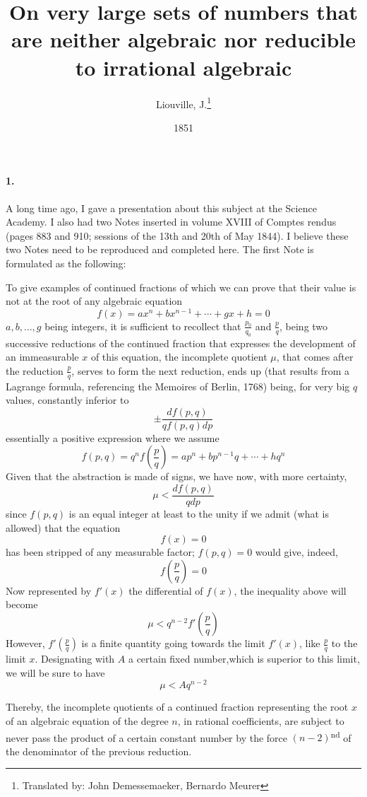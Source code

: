 \documentclass{article}
\title{On very large sets of numbers that are neither algebraic nor reducible to irrational algebraic}
\date{1851}
\author{Liouville, J.\thanks{%
    Translated by: John Demessemaeker, Bernardo Meurer}}
\begin{document}
\maketitle
\newpage

\paragraph{1.}
A long time ago, I gave a presentation about this subject at the Science
Academy. I also had two Notes inserted in volume XVIII of Comptes rendus
(pages 883 and 910; sessions of the 13th and 20th of May 1844). I believe these
two Notes need to be reproduced and completed here. The first Note is formulated
as the following:
\begin{displayquote}
	To give examples of continued fractions of which we can prove that their
	value is not at the root of any algebraic equation
	$$f(x)=ax^n + bx^{n-1} + \cdots + gx + h = 0$$
	$a, b, \ldots, g$ being integers, it is sufficient to recollect that
	$\frac{p_0}{q_0}$ and $\frac{p}{q}$, being two successive reductions of the
	continued fraction that expresses the development of an immeasurable $x$ of
	this equation, the incomplete quotient $\mu$, that comes after the reduction
	$\frac{p}{q}$, serves to form the next reduction, ends up (that results from
	a Lagrange formula, referencing the Memoires of Berlin, 1768) being, for
	very big $q$ values, constantly inferior to
	$$\pm\frac{df(p,q)}{qf(p,q)dp}$$
	essentially a positive expression where we assume
	$$f(p,q)=q^n f(\frac{p}{q}) = ap^n + bp^{n-1} q + \cdots + hq^n$$
	Given that the abstraction is made of signs, we have now, with more certainty,
	$$\mu < \frac{df(p,q)}{qdp}$$
	since $f(p, q)$ is an equal integer at least to the unity if we admit (what
	is allowed) that the equation
	$$f(x) = 0$$
	has been stripped of any measurable factor; $f(p,q) = 0$ would give, indeed,
	$$f(\frac{p}{q}) = 0$$
	Now represented by $f'(x)$ the differential of $f(x)$, the inequality above
	will become
	$$\mu < q^{n-2}f'(\frac{p}{q})$$
	However, $f'(\frac{p}{q})$ is a finite quantity going towards the limit
	$f'(x)$, like $\frac{p}{q}$ to the limit $x$. Designating with $A$ a certain
	fixed number,which is superior to this limit, we will be sure to have
	$$\mu < Aq^{n-2}$$

	Thereby, the incomplete quotients of a continued fraction representing the
	root $x$ of an algebraic equation of the degree $n$, in rational coefficients,
	are subject to never pass the product of a certain constant number by the
	force $(n-2)$\textsuperscript{nd} of the denominator of the previous
	reduction.


\end{displayquote}
\end{document}
